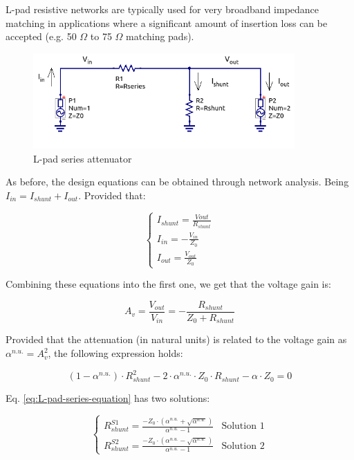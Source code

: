 \noindent L-pad resistive networks are typically used for very broadband impedance matching in applications where a significant amount of insertion loss can be accepted (e.g. 50 $\Omega$ to 75 $\Omega$ matching pads).

  \begin{figure}[ht]
    \centering
    \includegraphics[width=10cm]{./images/l-pad-series-attenuator-schematic.png}
    \caption{L-pad series attenuator}
    \label{fig:l-pad-series-attenuator-schematic}
  \end{figure}
  
\noindent As before, the design equations can be obtained through network analysis. Being $I_{in} = I_{shunt} + I_{out}$. Provided that:

  \begin{equation}
  	\begin{cases} I_{shunt} = \frac{Vout}{R_{shunt}} \\ I_{in} = - \frac{V_{in}}{Z_0} \\ I_{out} = \frac{V_{out}}{Z_0} \end{cases}
  \end{equation}
  
\noindent Combining these equations into the first one, we get that the voltage gain is:

\begin{equation}
	A_v = \frac{V_{out}}{V_{in}} = -\frac{R_{shunt}}{Z_0 + R_{shunt}}
\end{equation}

\noindent Provided that the attenuation (in natural units) is related to the voltage gain as $\alpha^{n.u.} = A_v^2$, the following expression holds:

\begin{equation}
	(1 - \alpha^{n.u.}) \cdot R_{shunt}^2 - 2 \cdot \alpha^{n.u.} \cdot Z_0 \cdot R_{shunt} - \alpha \cdot Z_0 = 0
	\label{eq:L-pad-series-equation}
\end{equation}

\noindent Eq. \ref{eq:L-pad-series-equation} has two solutions:

\begin{equation}
	\begin{cases}
		R_{shunt}^{S1} = \frac{- Z_0 \cdot (\alpha^{n.u.} + \sqrt{\alpha^{n.u.}})}{\alpha^{n.u.} - 1} & \text{Solution 1} \\
		R_{shunt}^{S2} = \frac{- Z_0 \cdot (\alpha^{n.u.} - \sqrt{\alpha^{n.u.}})}{\alpha^{n.u.} - 1} & \text{Solution 2}
	\end{cases}
\end{equation}

